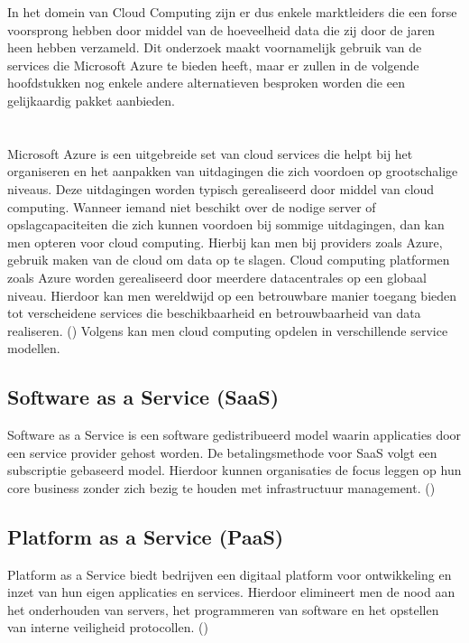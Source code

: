 In het domein van Cloud Computing zijn er dus enkele marktleiders die een forse voorsprong hebben door middel van de hoeveelheid data die zij door de jaren heen hebben verzameld. Dit onderzoek maakt voornamelijk gebruik van de services die Microsoft Azure te bieden heeft, maar er zullen in de volgende hoofdstukken nog enkele andere alternatieven besproken worden die een gelijkaardig pakket aanbieden. 

\section{}

Microsoft Azure is een uitgebreide set van cloud services die helpt bij het organiseren en het aanpakken van uitdagingen die zich voordoen op grootschalige niveaus. Deze uitdagingen worden typisch gerealiseerd door middel van cloud computing.  Wanneer iemand niet beschikt over de nodige server of opslagcapaciteiten die zich kunnen voordoen bij sommige uitdagingen, dan kan men opteren voor cloud computing.  Hierbij kan men bij providers zoals Azure, gebruik maken van de cloud om data op te slagen. Cloud computing platformen zoals Azure worden gerealiseerd door meerdere datacentrales op een globaal niveau. Hierdoor kan men wereldwijd op een betrouwbare manier toegang bieden tot verscheidene services die beschikbaarheid en betrouwbaarheid van data realiseren. (\cite{Microsoft2020a}) \newline
\newline
Volgens \cite{VaibhavAGhandi1999} kan men cloud computing opdelen in verschillende service modellen. 





\subsection{Software as a Service (SaaS)}
Software as a Service is een software gedistribueerd model waarin applicaties door een service provider gehost worden. De betalingsmethode voor SaaS volgt een subscriptie gebaseerd model. Hierdoor kunnen organisaties de focus leggen op hun core business zonder zich bezig te houden met infrastructuur management. (\cite{ManishGodse2009})
\subsection{Platform as a Service (PaaS)}
Platform as a Service biedt bedrijven een digitaal platform voor ontwikkeling en inzet van hun eigen applicaties en services. Hierdoor elimineert men de nood aan het onderhouden van servers, het programmeren van software en het opstellen van interne veiligheid protocollen. (\cite{Wright2019})
